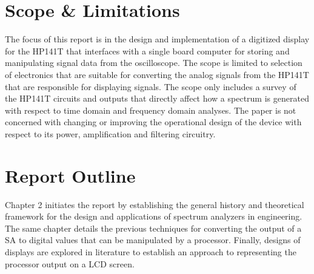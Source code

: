 \documentclass[class=report,11pt,crop=false]{standalone}
\begin{document}
\section{Scope \& Limitations}
The focus of this report is in the design and implementation of a digitized display for the HP141T that interfaces with a single board computer for storing and manipulating signal data from the oscilloscope. The scope is limited to selection of electronics that are suitable for converting the analog signals from the HP141T that are responsible for displaying signals. The scope only includes a survey of the HP141T circuits and outputs that directly affect how a spectrum is generated with respect to time domain and frequency domain analyses. The paper is not concerned with changing or improving the operational design of the device with respect to its power, amplification and filtering circuitry. 

\section{Report Outline}
Chapter 2 initiates the report by establishing the general history and theoretical framework for the design and applications of spectrum analyzers in engineering. The same chapter details the previous techniques for converting the output of a SA to digital values that can be manipulated by a processor. Finally, designs of displays are explored in literature to establish an approach to representing the processor output on a LCD screen. 
\ifstandalone

\printnoidxglossary[type=\acronymtype,nonumberlist]
\fi
\end{document}
